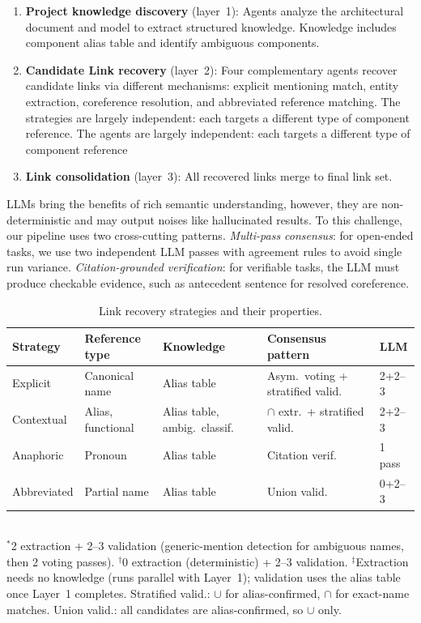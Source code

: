 \begin{enumerate}
\item \textbf{Project knowledge discovery} (layer~1): 
Agents analyze the architectural document and model to extract structured knowledge. 
Knowledge includes component alias table and identify ambiguous components. 
\item \textbf{Candidate Link recovery} (layer~2): 
Four complementary agents recover candidate links via different mechanisms: explicit mentioning match, entity extraction, coreference resolution, and abbreviated reference matching. 
The strategies are largely independent: each targets a different type of component reference.
The agents are largely independent: each targets a different type of component reference
\item \textbf{Link consolidation} (layer~3): All recovered links merge to final link set.
\end{enumerate}

\acp{LLM} bring the benefits of rich semantic understanding, however, they are non-deterministic and may output noises like hallucinated results.
To this challenge, our pipeline uses two cross-cutting patterns. 
\emph{Multi-pass consensus}: for open-ended tasks, we use two independent LLM passes with agreement rules to avoid single run variance.
\emph{Citation-grounded verification}: for verifiable tasks, the LLM must produce checkable evidence, such as antecedent sentence for resolved coreference.


\begin{table}[t]
\caption{Link recovery strategies and their properties.}
\label{tab:strategies}
\centering\footnotesize
\begin{tabular}{@{}lllll@{}}
\toprule
\textbf{Strategy} & \textbf{Reference type} & \textbf{Knowledge} & \textbf{Consensus pattern} & \textbf{LLM} \\
\midrule
Explicit & Canonical name & Alias table\rlap{$^\ddagger$} & Asym.\ voting + stratified valid. & 2+2--3\rlap{$^*$} \\
Contextual & Alias, functional & Alias table, ambig.\ classif. & $\cap$ extr.\ + stratified valid. & 2+2--3\rlap{$^*$} \\
Anaphoric & Pronoun & Alias table & Citation verif. & 1 pass \\
Abbreviated & Partial name & Alias table & Union valid. & 0+2--3\rlap{$^\dagger$} \\
\bottomrule
\end{tabular}
\\[2pt]
{\scriptsize $^*$2 extraction + 2--3 validation (generic-mention detection for ambiguous names, then 2 voting passes).
$^\dagger$0 extraction (deterministic) + 2--3 validation.
$^\ddagger$Extraction needs no knowledge (runs parallel with Layer~1);
validation uses the alias table once Layer~1 completes.
Stratified valid.: $\cup$ for alias-confirmed, $\cap$ for exact-name matches.
Union valid.: all candidates are alias-confirmed, so $\cup$ only.}
\end{table}

